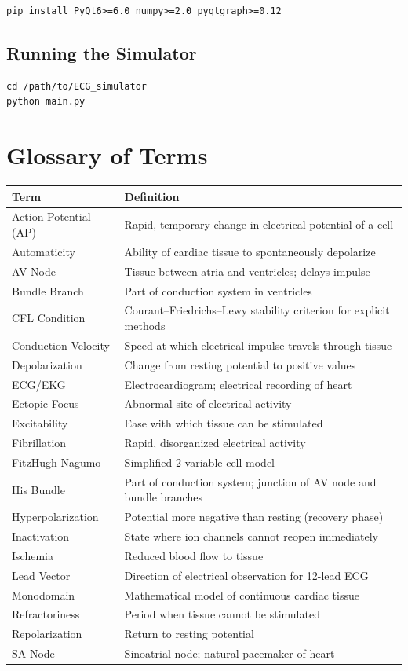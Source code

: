 \documentclass[11pt, a4paper]{article}
\begin{document}
\begin{verbatim}
pip install PyQt6>=6.0 numpy>=2.0 pyqtgraph>=0.12
\end{verbatim}

\subsection{Running the Simulator}

\begin{verbatim}
cd /path/to/ECG_simulator
python main.py
\end{verbatim}

\section{Glossary of Terms}

\begin{tabularx}{\textwidth}{|l|X|}
\hline
\textbf{Term} & \textbf{Definition} \\
\hline
Action Potential (AP) & Rapid, temporary change in electrical potential of a cell \\
Automaticity & Ability of cardiac tissue to spontaneously depolarize \\
AV Node & Tissue between atria and ventricles; delays impulse \\
Bundle Branch & Part of conduction system in ventricles \\
CFL Condition & Courant--Friedrichs--Lewy stability criterion for explicit methods \\
Conduction Velocity & Speed at which electrical impulse travels through tissue \\
Depolarization & Change from resting potential to positive values \\
ECG/EKG & Electrocardiogram; electrical recording of heart \\
Ectopic Focus & Abnormal site of electrical activity \\
Excitability & Ease with which tissue can be stimulated \\
Fibrillation & Rapid, disorganized electrical activity \\
FitzHugh-Nagumo & Simplified 2-variable cell model \\
His Bundle & Part of conduction system; junction of AV node and bundle branches \\
Hyperpolarization & Potential more negative than resting (recovery phase) \\
Inactivation & State where ion channels cannot reopen immediately \\
Ischemia & Reduced blood flow to tissue \\
Lead Vector & Direction of electrical observation for 12-lead ECG \\
Monodomain & Mathematical model of continuous cardiac tissue \\
Refractoriness & Period when tissue cannot be stimulated \\
Repolarization & Return to resting potential \\
SA Node & Sinoatrial node; natural pacemaker of heart \\
\hline
\end{tabularx}
\end{document}
